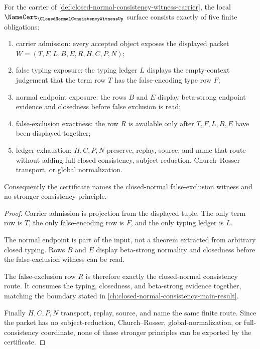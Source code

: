 \begin{theorem}\label{thm:closed-normal-consistency-witness-namecert-obligations}
For the carrier of \autoref{def:closed-normal-consistency-witness-carrier}, the local $\NameCert_{\ClosedNormalConsistencyWitnessUp}$ surface consists exactly of five finite obligations:
\begin{enumerate}
\item carrier admission: every accepted object exposes the displayed packet $W=(T,F,L,B,E,R,H,C,P,N)$;
\item false typing exposure: the typing ledger $L$ displays the empty-context judgement that the term row $T$ has the false-encoding type row $F$;
\item normal endpoint exposure: the rows $B$ and $E$ display beta-strong endpoint evidence and closedness before false exclusion is read;
\item false-exclusion exactness: the row $R$ is available only after $T,F,L,B,E$ have been displayed together;
\item ledger exhaustion: $H,C,P,N$ preserve, replay, source, and name that route without adding full closed consistency, subject reduction, Church--Rosser transport, or global normalization.
\end{enumerate}
Consequently the certificate names the closed-normal false-exclusion witness and no stronger consistency principle.
\end{theorem}
\begin{proof}
Carrier admission is projection from the displayed tuple. The only term row is $T$, the only false-encoding row is $F$, and the only typing ledger is $L$.

The normal endpoint is part of the input, not a theorem extracted from arbitrary closed typing. Rows $B$ and $E$ display beta-strong normality and closedness before the false-exclusion witness can be read.

The false-exclusion row $R$ is therefore exactly the closed-normal consistency route. It consumes the typing, closedness, and beta-strong evidence together, matching the boundary stated in \autoref{ch:closed-normal-consistency-main-result}.

Finally $H,C,P,N$ transport, replay, source, and name the same finite route. Since the packet has no subject-reduction, Church--Rosser, global-normalization, or full-consistency coordinate, none of those stronger principles can be exported by the certificate.
\end{proof}

